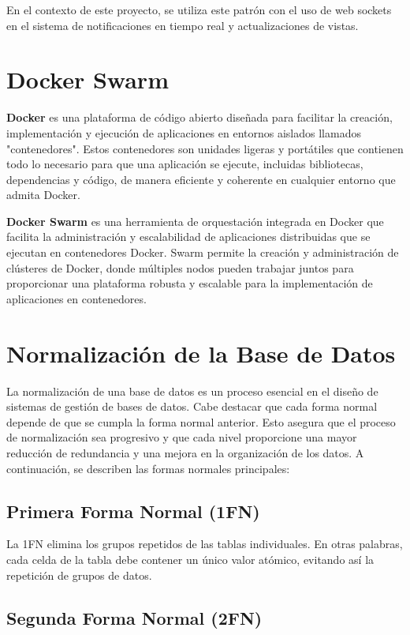 En el contexto de este proyecto, se utiliza este patrón con el uso de web sockets en el sistema de notificaciones en tiempo real y actualizaciones de vistas.

\section{Docker Swarm}
\textbf{Docker} es una plataforma de código abierto diseñada para facilitar la creación, implementación y ejecución de aplicaciones en entornos aislados llamados "contenedores". Estos contenedores son unidades ligeras y portátiles que contienen todo lo necesario para que una aplicación se ejecute, incluidas bibliotecas, dependencias y código, de manera eficiente y coherente en cualquier entorno que admita Docker.

\textbf{Docker Swarm} es una herramienta de orquestación integrada en Docker que facilita la administración y escalabilidad de aplicaciones distribuidas que se ejecutan en contenedores Docker. Swarm permite la creación y administración de clústeres de Docker, donde múltiples nodos pueden trabajar juntos para proporcionar una plataforma robusta y escalable para la implementación de aplicaciones en contenedores.



\section{Normalización de la Base de Datos}

La normalización de una base de datos es un proceso esencial en el diseño de sistemas de gestión de bases de datos. 
Cabe destacar que cada forma normal depende de que se cumpla la forma normal anterior. Esto asegura que el proceso de normalización sea progresivo y que cada nivel proporcione una mayor reducción de redundancia y una mejora en la organización de los datos.
A continuación, se describen las formas normales principales:

\subsection{Primera Forma Normal (1FN)}

La 1FN elimina los grupos repetidos de las tablas individuales. En otras palabras, cada celda de la tabla debe contener un único valor atómico, evitando así la repetición de grupos de datos.

\subsection{Segunda Forma Normal (2FN)}

